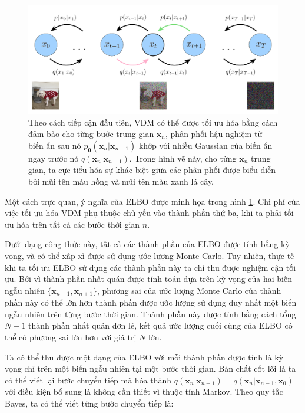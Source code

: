 \documentclass[14pt, a4paper]{article}
\numberwithin{equation}{section}
\numberwithin{figure}{section}
\numberwithin{dl}{section}
\numberwithin{md}{section}
\numberwithin{bd}{section}
\numberwithin{dn}{section}
\numberwithin{hq}{section}
\begin{document}
    \begin{figure}[h!]
        \centering
        \includegraphics[width=\textwidth]{VDM-Optimize.png}
        \caption{Theo cách tiếp cận đầu tiên, VDM có thể được tối ưu hóa bằng cách đảm bảo cho từng bước trung gian $\boldsymbol{x}_n$, phân phối hậu nghiệm từ biến ẩn sau nó $p_{\boldsymbol{\theta}} (\boldsymbol{x}_n \vert \boldsymbol{x}_{n+1})$ khớp với nhiễu Gaussian của biến ẩn ngay trước nó $q(\boldsymbol{x}_{n} \vert \boldsymbol{x}_{n-1})$.
        Trong hình vẽ này, cho từng $\boldsymbol{x}_n$ trung gian, ta cực tiểu hóa sự khác biệt giữa các phân phối được biểu diễn bởi mũi tên màu hồng và mũi tên màu xanh lá cây.}
        \label{fig:VDM-Optimize}
    \end{figure}

    Một cách trực quan, ý nghĩa của ELBO được minh họa trong hình \ref{fig:VDM-Optimize}.
    Chi phí của việc tối ưu hóa VDM phụ thuộc chủ yếu vào thành phần thứ ba, khi ta phải tối ưu hóa trên tất cả các bước thời gian $n$.

    Dưới dạng công thức này, tất cả các thành phần của ELBO được tính bằng kỳ vọng, và có thể xấp xỉ được sử dụng ước lượng Monte Carlo.
    Tuy nhiên, thực tế khi ta tối ưu ELBO sử dụng các thành phần này ta chỉ thu được nghiệm cận tối ưu.
    Bởi vì thành phần nhất quán được tính toán dựa trên kỳ vọng của hai biến ngẫu nhiên $\lbrace \boldsymbol{x}_{n-1}, \boldsymbol{x}_{n+1} \rbrace$, phương sai của ước lượng Monte Carlo của thành phần này có thể lớn hơn thành phần được ước lượng sử dụng duy nhất một biến ngẫu nhiên trên từng bước thời gian.
    Thành phần này được tính bằng cách tổng $N-1$ thành phần nhất quán đơn lẻ, kết quả ước lượng cuối cùng của ELBO có thể có phương sai lớn hơn với giá trị $N$ lớn.

    Ta có thể thu được một dạng của ELBO với mỗi thành phần được tính là kỳ vọng chỉ trên một biến ngẫu nhiên tại một bước thời gian.
    Bản chất cốt lõi là ta có thể viết lại bước chuyển tiếp mã hóa thành $q(\boldsymbol{x}_n \vert \boldsymbol{x}_{n-1})=q(\boldsymbol{x}_n \vert \boldsymbol{x}_{n-1}, \boldsymbol{x}_0)$ với điều kiện bổ sung là không cần thiết vì thuộc tính Markov.
    Theo quy tắc Bayes, ta có thể viết từng bước chuyển tiếp là:
\end{document}
